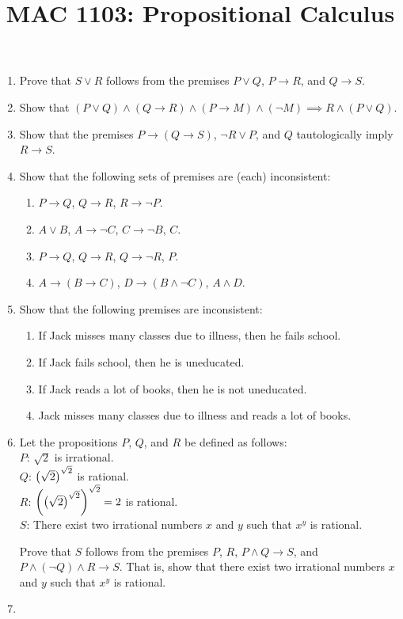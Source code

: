 \documentclass[svgnames]{amsart}
\title{MAC 1103: Propositional Calculus}
\date{}
\begin{document}
\maketitle
\begin{enumerate}[leftmargin=*]
\item Prove that $S \vee R$ follows from the premises $P  \vee Q$, $P \to R$, and $Q \to S$.

\item Show that $(P \vee Q) \wedge (Q \to R) \wedge (P \to M) \wedge (\neg M) \implies R \wedge (P \vee Q)$.

\item Show that the premises $P \to (Q \to S)$, $\neg R \vee P$, and $Q$ tautologically imply $R \to S$.

\item Show that the following sets of premises are (each) inconsistent:
\begin{enumerate}
\item $P \to Q$, $Q \to R$, $R \to \neg P$.
\item $A \vee B$, $A \to \neg C$, $C \to \neg B$, $C$.
\item $P \to Q$, $Q \to R$, $Q \to \neg R$, $P$.
\item $A \to (B \to C)$, $D \to (B \wedge \neg C)$, $A \wedge D$.
\end{enumerate}

\item Show that the following premises are inconsistent:
\begin{enumerate}
\item If Jack misses many classes due to illness, then he fails school.
\item If Jack fails school, then he is uneducated.
\item If Jack reads a lot of books, then he is not uneducated.
\item Jack misses many classes due to illness and reads a lot of books.
\end{enumerate}

\item Let the propositions $P$, $Q$, and $R$ be defined as follows: \\
$P$: $\sqrt 2$ is irrational. \\
$Q$: $\pqty{\sqrt 2}^{\sqrt 2}$ is rational. \\
$R$: $\pqty{ \pqty{\sqrt 2}^{\sqrt 2} }^{\sqrt 2} = 2$ is rational. \\
$S$: There exist two irrational numbers $x$ and $y$ such that $x^y$ is rational.

Prove that $S$ follows from the premises $P$, $R$, $P \wedge Q \to S$, and $P \wedge (\neg Q) \wedge R \to S$. That is, show that there exist two irrational numbers $x$ and $y$ such that $x^y$ is rational.

\item 
\end{enumerate}
\end{document}
